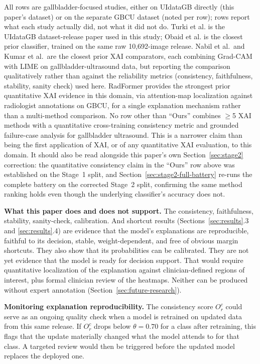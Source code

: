 \begin{table}[!ht]
\vspace{2pt}
\raggedright\footnotesize All rows are gallbladder-focused studies, either on UIdataGB directly (this paper's dataset) or on the separate GBCU dataset (noted per row); rows report what each study actually did, not what it did not do. Turki et al. is the UIdataGB dataset-release paper used in this study; Obaid et al. is the closest prior classifier, trained on the same raw 10,692-image release. Nabil et al.\ and Kumar et al.\ are the closest prior XAI comparators, each combining Grad-CAM with LIME on gallbladder-ultrasound data, but reporting the comparison qualitatively rather than against the reliability metrics (consistency, faithfulness, stability, sanity check) used here. RadFormer provides the strongest prior quantitative XAI evidence in this domain, via attention-map localization against radiologist annotations on GBCU, for a single explanation mechanism rather than a multi-method comparison. No row other than ``Ours'' combines $\ge$5 XAI methods with a quantitative cross-training consistency metric and grounded failure-case analysis for gallbladder ultrasound. This is a narrower claim than being the first application of XAI, or of any quantitative XAI evaluation, to this domain. It should also be read alongside this paper's own Section~\ref{sec:stage2} correction: the quantitative consistency claim in the ``Ours'' row above was established on the Stage~1 split, and Section~\ref{sec:stage2-full-battery} re-runs the complete battery on the corrected Stage~2 split, confirming the same method ranking holds even though the underlying classifier's accuracy does not.
\end{table}

\textbf{What this paper does and does not support.} The consistency, faithfulness, stability, sanity-check, calibration. And shortcut results (Sections~\ref{sec:results}.3 and \ref{sec:results}.4) are evidence that the model's explanations are reproducible, faithful to its decision, stable, weight-dependent, and free of obvious margin shortcuts. They also show that its probabilities can be calibrated. They are not yet evidence that the model is ready for decision support. That would require quantitative localization of the explanation against clinician-defined regions of interest, plus formal clinician review of the heatmaps. Neither can be produced without expert annotation (Section~\ref{sec:future-research}).

\textbf{Monitoring explanation reproducibility.} The consistency score $O_r^c$ could serve as an ongoing quality check when a model is retrained on updated data from this same release. If $O_r^c$ drops below $\theta=0.70$ for a class after retraining, this flags that the update materially changed what the model attends to for that class. A targeted review would then be triggered before the updated model replaces the deployed one.

